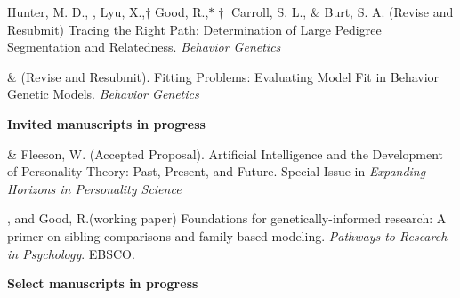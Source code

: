 \begin{etaremune}
\item Hunter, M. D., \meb, Lyu, X.,$\dagger$ Good, R.,$*\dagger$ Carroll, S. L., \& Burt, S. A. (Revise and Resubmit) Tracing the Right Path: Determination of Large Pedigree Segmentation and Relatedness. \textit{Behavior Genetics}


\item \meb \& \joe (Revise and Resubmit). Fitting Problems: Evaluating Model Fit in Behavior Genetic Models. \textit{Behavior Genetics}  \href{https://doi.org/10.31234/osf.io/qys83}{\small\color{blue}{10.31234/osf.io/qys83}}
\end{etaremune}
{\large \textbf{Invited manuscripts in progress}}
\begin{etaremune}


\item \meb \& Fleeson, W. (Accepted Proposal). Artificial Intelligence and the Development of Personality Theory: Past, Present, and Future. Special Issue in \textit{Expanding Horizons in Personality Science}


\item \meb, and Good, R.\noteA (working paper) Foundations for genetically-informed research: A primer on sibling comparisons and family-based modeling. \textit{Pathways to Research in Psychology}. EBSCO.
\end{etaremune}
%



{\large \textbf{Select manuscripts in progress}}

